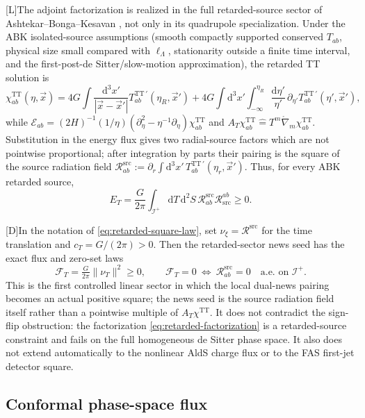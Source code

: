 \documentclass[11pt,a4paper]{article}
\newcommand{\scri}{\mathscr{I}}
\newcommand{\cE}{\mathcal{E}}
\newcommand{\cR}{\mathcal{R}}
\newcommand{\diff}{\mathrm{d}}
\newcommand{\statusL}{\textsf{[L]}}
\newcommand{\statusD}{\textsf{[D]}}
\begin{document}
\statusL The adjoint factorization is realized in the full retarded-source sector of Ashtekar--Bonga--Kesavan \cite{ashtekar2015quadrupole}, not only in its quadrupole specialization.  Under the ABK isolated-source assumptions (smooth compactly supported conserved \(T_{ab}\), physical size small compared with \(\ell_\Lambda\), stationarity outside a finite time interval, and the first-post-de Sitter/slow-motion approximation), the retarded TT solution is
\[
  \chi^{\mathrm{TT}}_{ab}(\eta,\vec x)
  =
  4G\int\frac{\diff^3x'}{|\vec x-\vec x'|}
  T^{\mathrm{TT}\, '}_{ab}(\eta_R,\vec x')
  +
  4G\int\diff^3x'\int_{-\infty}^{\eta_R}
  \frac{\diff\eta'}{\eta'}\,
  \partial_{\eta'}T^{\mathrm{TT}\, '}_{ab}(\eta',\vec x') ,
\]
while \(\cE_{ab}=(2H)^{-1}(1/\eta)(\partial_\eta^2-\eta^{-1}\partial_\eta)\chi^{\mathrm{TT}}_{ab}\) and
\(A_T\chi^{\mathrm{TT}}_{ab}\hat{=}T^m\mathring\nabla_m\chi^{\mathrm{TT}}_{ab}\).  Substitution in the energy flux gives two radial-source factors which are not pointwise proportional; after integration by parts their pairing is the square of the source radiation field
\(\cR^{\mathrm{src}}_{ab}:=\partial_r\!\int\!\diff^3x'\,T^{\mathrm{TT}\, '}_{ab}(\eta_r,\vec x')\).  Thus, for every ABK retarded source,
\begin{equation}\label{eq:retarded-source-square}
  E_T
  =
  \frac{G}{2\pi}
  \int_{\scri^+}
  \diff T\,\diff^2S\,
  \cR^{\mathrm{src}}_{ab}\cR_{\mathrm{src}}^{ab}
  \ge0 .
\end{equation}

\statusD In the notation of \eqref{eq:retarded-square-law}, set
\(\nu_\xi=\cR^{\mathrm{src}}\) for the time translation and \(c_T=G/(2\pi)>0\).  Then the retarded-sector news seed has the exact flux and zero-set laws
\[
  \mathcal F_T=\tfrac{G}{2\pi}\|\nu_T\|^2\ge0,
  \qquad
  \mathcal F_T=0\ \Longleftrightarrow\ \cR^{\mathrm{src}}_{ab}=0
  \quad\text{a.e.\ on }\scri^+ .
\]
This is the first controlled linear sector in which the local dual-news pairing becomes an actual positive square; the news seed is the source radiation field itself rather than a pointwise multiple of \(A_T\chi^{\mathrm{TT}}\).  It does not contradict the sign-flip obstruction: the factorization \eqref{eq:retarded-factorization} is a retarded-source constraint and fails on the full homogeneous de Sitter phase space.  It also does not extend automatically to the nonlinear AldS charge flux or to the FAS first-jet detector square.

\subsection{Conformal phase-space flux}
\end{document}
